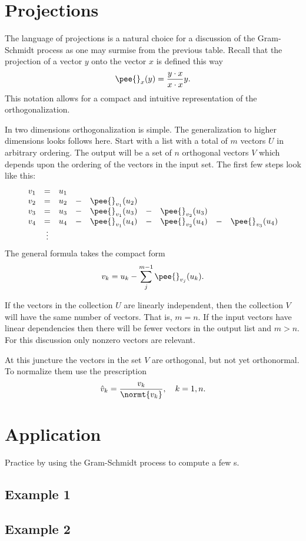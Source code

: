 \section{Projections}
The language of projections is a natural choice for a discussion of the Gram-Schmidt process as one may surmise from the previous table. Recall that the projection of a vector $y$ onto the vector $x$ is defined this way
\begin{equation}
  \pee{}_{x}(y) = \frac{y\cdot x}{x\cdot x}y.
\end{equation}
This notation allows for a compact and intuitive representation of the orthogonalization.

In two dimensions orthogonalization is simple. The generalization to higher dimensions looks follows here. Start with a list with a total of $m$ vectors $U$ in arbitrary ordering. The output will be a set of $n$ orthogonal vectors $V$ which depends upon the ordering of the vectors in the input set. The first few steps look like this:
\begin{equation}
  \begin{array}{cccccccccc}
    v_{1} &=& u_{1}\\
    v_{2} &=& u_{2} &-& \pee{}_{v_{1}}(u_{2})\\
    v_{3} &=& u_{3} &-& \pee{}_{v_{1}}(u_{3}) &-& \pee{}_{v_{2}}(u_{3})\\
    v_{4} &=& u_{4} &-& \pee{}_{v_{1}}(u_{4}) &-& \pee{}_{v_{2}}(u_{4}) &-& \pee{}_{v_{3}}(u_{4})\\
     & \vdots
  \end{array}
\end{equation}
The general formula takes the compact form
\begin{equation}
  v_{k} = u_{k} - \sum_{j}^{m-1}{\pee{}_{v_{j}}(u_{k})}.
\end{equation}

If the vectors in the collection $U$ are linearly independent, then the collection $V$ will have the same number of vectors. That is, $m=n$. If the input vectors have linear dependencies then there will be fewer vectors in the output list and $m>n$. For this discussion only nonzero vectors are relevant.
 
At this juncture the vectors in the set $V$ are orthogonal, but not yet orthonormal. To normalize them use the prescription
\begin{equation}
  \hat{v}_{k} = \frac{v_{k}}{\normt{v_{k}}}, \quad k=1,n.
\end{equation}


\section{Application}
Practice by using the Gram-Schmidt process to compute a few \svdl s.

\subsection{Example 1}

\subsection{Example 2}



\endinput